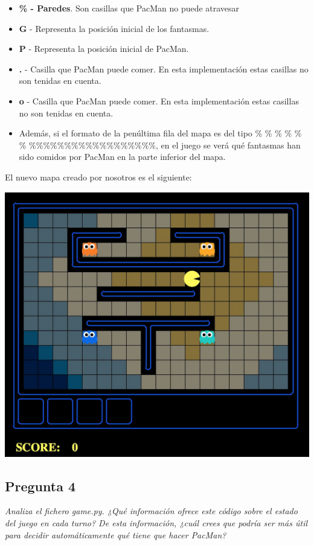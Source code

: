 \documentclass[12pt]{article}
\begin{document}
\begin{itemize}
    \item \textbf{\% - Paredes}. Son casillas que PacMan no puede atravesar
    \item \textbf{G} - Representa la posición inicial de los fantasmas.
    \item \textbf{P} - Representa la posición inicial de PacMan.
    \item \textbf{.} - Casilla que PacMan puede comer. En esta implementación
    estas casillas no son tenidas en cuenta.
    \item \textbf{o} - Casilla que PacMan puede comer. En esta implementación
    estas casillas no son tenidas en cuenta.
    \item Además, si el formato de la penúltima fila del mapa es del tipo \% \%
    \% \% \% \% \%\%\%\%\%\%\%\%\%\%\%\%\%\%\%\%\%\%, en el juego se verá qué
    fantasmas han sido comidos por PacMan en la parte inferior del mapa.
\end{itemize}

El nuevo mapa creado por nosotros es el siguiente:\\
\begin{center}
    \vspace{-17pt}
    \includegraphics[scale=0.25]{map.jpg}
\end{center}

\newpage
\begin{center}
\subsection{Pregunta 4}

\emph{Analiza el fichero game.py. ¿Qué información ofrece este código sobre el
estado del juego en cada turno? De esta información, ¿cuál crees que podría
ser más útil para decidir automáticamente qué tiene que hacer PacMan?}
\end{center}
\end{document}
